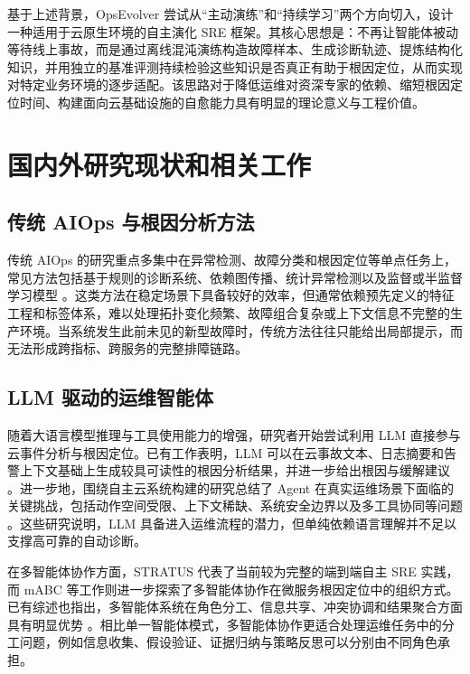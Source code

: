 基于上述背景，OpsEvolver 尝试从“主动演练”和“持续学习”两个方向切入，设计一种适用于云原生环境的自主演化 SRE 框架。其核心思想是：不再让智能体被动等待线上事故，而是通过离线混沌演练构造故障样本、生成诊断轨迹、提炼结构化知识，并用独立的基准评测持续检验这些知识是否真正有助于根因定位，从而实现对特定业务环境的逐步适配。该思路对于降低运维对资深专家的依赖、缩短根因定位时间、构建面向云基础设施的自愈能力具有明显的理论意义与工程价值。

\section{国内外研究现状和相关工作}
\label{sec:related_work}

\subsection{传统 AIOps 与根因分析方法}

传统 AIOps 的研究重点多集中在异常检测、故障分类和根因定位等单点任务上，常见方法包括基于规则的诊断系统、依赖图传播、统计异常检测以及监督或半监督学习模型 \cite{diaz2023joint}。这类方法在稳定场景下具备较好的效率，但通常依赖预先定义的特征工程和标签体系，难以处理拓扑变化频繁、故障组合复杂或上下文信息不完整的生产环境。当系统发生此前未见的新型故障时，传统方法往往只能给出局部提示，而无法形成跨指标、跨服务的完整排障链路。

\subsection{LLM 驱动的运维智能体}

随着大语言模型推理与工具使用能力的增强，研究者开始尝试利用 LLM 直接参与云事件分析与根因定位。已有工作表明，LLM 可以在云事故文本、日志摘要和告警上下文基础上生成较具可读性的根因分析结果，并进一步给出根因与缓解建议 \cite{chen2024automaticrca,ahmed2023recommending,xu2025openrca}。进一步地，围绕自主云系统构建的研究总结了 Agent 在真实运维场景下面临的关键挑战，包括动作空间受限、上下文稀缺、系统安全边界以及多工具协同等问题 \cite{shetty2024building}。这些研究说明，LLM 具备进入运维流程的潜力，但单纯依赖语言理解并不足以支撑高可靠的自动诊断。

在多智能体协作方面，STRATUS \cite{chen2025stratus} 代表了当前较为完整的端到端自主 SRE 实践，而 mABC \cite{zhang2024mabc} 等工作则进一步探索了多智能体协作在微服务根因定位中的组织方式。已有综述也指出，多智能体系统在角色分工、信息共享、冲突协调和结果聚合方面具有明显优势 \cite{tran2025multi}。相比单一智能体模式，多智能体协作更适合处理运维任务中的分工问题，例如信息收集、假设验证、证据归纳与策略反思可以分别由不同角色承担。

